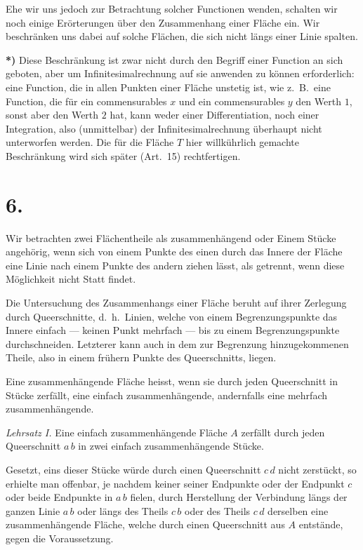 \documentclass{article}
\begin{document}
Ehe wir uns jedoch zur Betrachtung solcher Functionen wenden, schalten wir noch einige Erörterungen über den Zusammenhang einer Fläche ein. Wir beschränken uns dabei auf solche Flächen, die sich nicht längs einer Linie spalten.

\textbf{*)} Diese Beschränkung ist zwar nicht durch den Begriff einer Function an sich geboten, aber um Infinitesimalrechnung auf sie anwenden zu können erforderlich: eine Function, die in allen Punkten einer Fläche unstetig ist, wie z.\ B.\ eine Function, die für ein commensurables $x$ und ein commensurables $y$ den Werth $1$, sonst aber den Werth $2$ hat, kann weder einer Differentiation, noch einer Integration, also (unmittelbar) der Infinitesimalrechnung überhaupt nicht unterworfen werden. Die für die Fläche $T$ hier willkührlich gemachte Beschränkung wird sich später (Art.~15) rechtfertigen.

\section*{6.}

Wir betrachten zwei Flächentheile als zusammenhängend oder Einem Stücke angehörig, wenn sich von einem Punkte des einen durch das Innere der Fläche eine Linie nach einem Punkte des andern ziehen lässt, als getrennt, wenn diese Möglichkeit nicht Statt findet.

Die Untersuchung des Zusammenhangs einer Fläche beruht auf ihrer Zerlegung durch Queerschnitte, d.\ h.\ Linien, welche von einem Begrenzungspunkte das Innere einfach --- keinen Punkt mehrfach --- bis zu einem Begrenzungspunkte durchschneiden. Letzterer kann auch in dem zur Begrenzung hinzugekommenen Theile, also in einem frühern Punkte des Queerschnitts, liegen.

Eine zusammenhängende Fläche heisst, wenn sie durch jeden Queerschnitt in Stücke zerfällt, eine einfach zusammenhängende, andernfalls eine mehrfach zusammenhängende.

\emph{Lehrsatz I.} Eine einfach zusammenhängende Fläche $A$ zerfällt durch jeden Queerschnitt $a\,b$ in zwei einfach zusammenhängende Stücke.

Gesetzt, eins dieser Stücke würde durch einen Queerschnitt $c\,d$ nicht zerstückt, so erhielte man offenbar, je nachdem keiner seiner Endpunkte oder der Endpunkt $c$ oder beide Endpunkte in $a\,b$ fielen, durch Herstellung der Verbindung längs der ganzen Linie $a\,b$ oder längs des Theils $c\,b$ oder des Theils $c\,d$ derselben eine zusammenhängende Fläche, welche durch einen Queerschnitt aus $A$ entstände, gegen die Voraussetzung.
\end{document}
